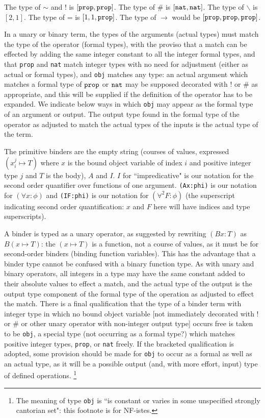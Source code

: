 \documentclass{article}
\begin{document}
{{The type of $\sim$ and $!$ is $[{\tt prop},{\tt prop}]$.  The type of $\#$ is $[{\tt nat},{\tt nat}]$.  The type of $\backslash$ is $[2,1]$.  The type of = is $[1,1,{\tt prop}]$.  The type of $\rightarrow$ would be $[{\tt prop},{\tt prop},{\tt prop}]$.

In a unary or binary term, the types of the arguments (actual types) must match the type of the operator (formal types), with the proviso that 
a match can be effected by adding the same integer constant to all the integer formal types, and that {\tt prop} and {\tt nat} match integer types with no need for adjustment (either as actual or formal types), and {\tt obj} matches any type:  an actual argument which matches a formal type of ${\tt prop}$ or ${\tt nat}$ may be supposed decorated
with $!$ or $\#$ as appropriate, and this will be supplied if the definition of the operator has to be expanded.   We indicate below ways in which {\tt obj} may appear as the formal type of an argument or output. The output type found in the formal type of the operator as adjusted to match the actual types of the inputs is the actual type of the term.

The primitive binders are  the empty string (courses of values, expressed $(x^j_i \mapsto T)$ where $x$ is the bound object variable of index $i$ and positive integer type $j$ and $T$ is the body), $A$ and $I$.  $I$ for ``impredicative" is our notation for the second order quantifier over functions of one argument.  {\tt (Ax:phi)}
is our notation for $(\forall x:\phi)$ and {\tt (IF:phi)} is our notation for $(\forall^2F:\phi)$ (the superscript indicating second order quantification:  $x$ and $F$ here will have indices and type superscripts).

A binder is typed as a unary operator, as suggested by rewriting $(Bx:T)$ as $B(x \mapsto T)$:  the $(x \mapsto T)$ is a function, not a course of values, as it must be for second-order binders (binding function variables).  This has the advantage that a binder type cannot be confused with a binary function type.   As with unary and binary operators, all integers in a type may have the same constant added to their absolute values to effect a match, and the actual type of the output is the output type component of the formal type of the operation as adjusted to effect the match.  There is a final qualification that the type of a binder term with integer type in which no bound object variable [not immediately decorated with $!$ or $\#$ or other unary operator with non-integer output type] occurs free is taken to be {\tt obj}, a special type (not occurring as a formal type?) which matches positive integer types, {\tt prop}, or {\tt nat} freely.  If the bracketed qualification is adopted, some provision should be made for {\tt obj} to occur as a formal as well as an actual type, as it will be a possible output (and, with more effort, input) type of defined operations.  \footnote{The meaning of type {\tt obj} is ``is constant or varies in some unspecified strongly cantorian set":  this footnote is for NF-istes.}

}}
\end{document}
